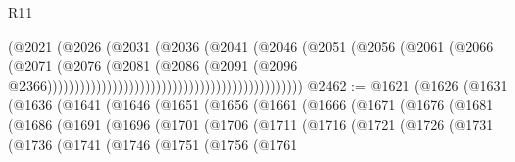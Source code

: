 \begin{lexlean}{R11}
\begin{coremodule}
                                                                  (@2021
                                                                    (@2026
                                                                      (@2031
                                                                        (@2036
                                                                          (@2041
                                                                            (@2046
                                                                              (@2051
                                                                                (@2056
                                                                                  (@2061
                                                                                    (@2066
                                                                                      (@2071
                                                                                        (@2076
                                                                                          (@2081
                                                                                            (@2086
                                                                                              (@2091
                                                                                                (@2096
                                                                                                  @2366)))))))))))))))))))))))))))))))))))))))))))))))
@2462 := @1621
    (@1626
      (@1631
        (@1636
          (@1641
            (@1646
              (@1651
                (@1656
                  (@1661
                    (@1666
                      (@1671
                        (@1676
                          (@1681
                            (@1686
                              (@1691
                                (@1696
                                  (@1701
                                    (@1706
                                      (@1711
                                        (@1716
                                          (@1721
                                            (@1726
                                              (@1731
                                                (@1736
                                                  (@1741
                                                    (@1746
                                                      (@1751
                                                        (@1756
                                                          (@1761

\end{coremodule}
\end{lexlean}

